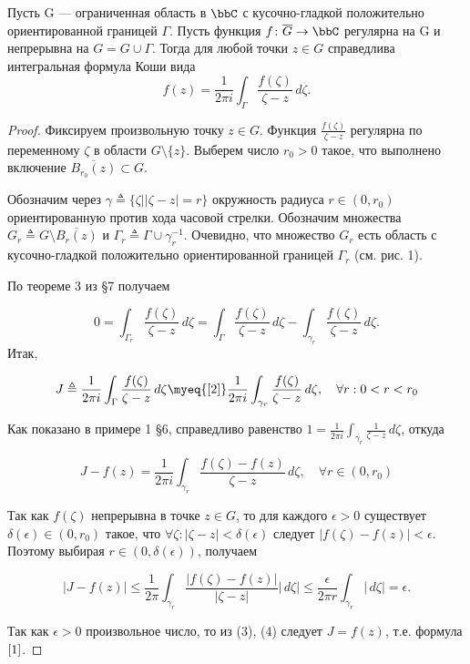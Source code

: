 \begin{thm} \label{T1}
 Пусть G — ограниченная область в $\bbC$ с кусочно-гладкой положительно ориентированной границей $\Gamma$. Пусть функция $f\colon \overline{G}\to \bbC$ регулярна на G и непрерывна на $G=G\cup\Gamma$. Тогда для любой точки $z\in G$ справедлива интегральная формула Коши вида
 \begin{equation} \label{1}
 f(z) = \frac{1}{2\pi i}\int_\Gamma \frac{f(\zeta)}{\zeta - z}\,d\zeta.
 \end{equation}
\end{thm}
\begin{proof}
Фиксируем произвольную точку $z \in G$. Функция $\frac{f(\zeta)}{\zeta - z}$ регулярна по переменному $\zeta$ в области $G \setminus \{z\}$. Выберем число $r_0 > 0$ такое, что выполнено включение $\overline{B_{r_0}(z)}\subset G$. 

Обозначим через $\gamma \triangleq \{ \zeta \bigl| |\zeta - z| = r \}$ окружность радиуса $r \in (0, r_0)$ ориентированную против хода часовой стрелки. Обозначим множества $G_r \triangleq G \setminus \overline{B_r(z)}$ и $\Gamma_r \triangleq \Gamma \cup \gamma_r^{-1}$. Очевидно, что множество $G_r$ есть область с кусочно-гладкой положительно ориентированной границей $\Gamma_r$ (см. рис. 1). 

По теореме 3 из §7 получаем

 \begin{equation} \label{2}
 0 = \int_{\Gamma_r} \frac{f(\zeta)}{\zeta - z}\,d\zeta = \int_\Gamma \frac{f(\zeta)}{\zeta - z}\,d\zeta - \int_{\gamma_r} \frac{f(\zeta)}{\zeta - z}\,d\zeta.
 \end{equation}
Итак,

\begin{equation} \label{3}
J \triangleq \frac{1}{2\pi i} \int_\Gamma \frac{f(\zeta)}{\zeta - z}\,d\zeta \myeq{\eqref{2}} \frac{1}{2\pi i} \int_{\gamma_r} \frac{f(\zeta)}{\zeta - z}\,d\zeta,  \quad  \forall r: 0 < r < r_0
\end{equation}

Как показано в примере 1 §6, справедливо равенство $1 = \frac{1}{2\pi i} \int_{\gamma_r} \frac{1}{\zeta - z}\,d\zeta$, откуда 

$$J - f(z) = \frac{1}{2\pi i} \int_{\gamma_r} \frac{f(\zeta) - f(z)}{\zeta - z}\,d\zeta, \quad  \forall r \in (0,r_0)$$

Так как $f(\zeta)$ непрерывна в точке $z \in G$, то для каждого $\epsilon > 0$ существует $\delta(\epsilon) \in (0, r_0)$ такое, что $\forall \zeta : |\zeta - z| < \delta(\epsilon)$ следует $|f(\zeta) - f(z)| < \epsilon$. Поэтому выбирая $r \in (0, \delta(\epsilon))$, получаем

\begin{equation} \label{4}
|J - f(z)| \le \frac{1}{2\pi} \int_{\gamma_r} \frac{|f(\zeta) - f(z)|}{|\zeta - z|}|\,d\zeta| \le 
\frac{\epsilon}{2 \pi r} \int_{\gamma_r} |\,d\zeta| = \epsilon.
\end{equation}

Так как $\epsilon > 0$ произвольное число, то из (3), (4) следует $J = f(z)$, т.е. формула $\eqref{1}$.
\end{proof}

